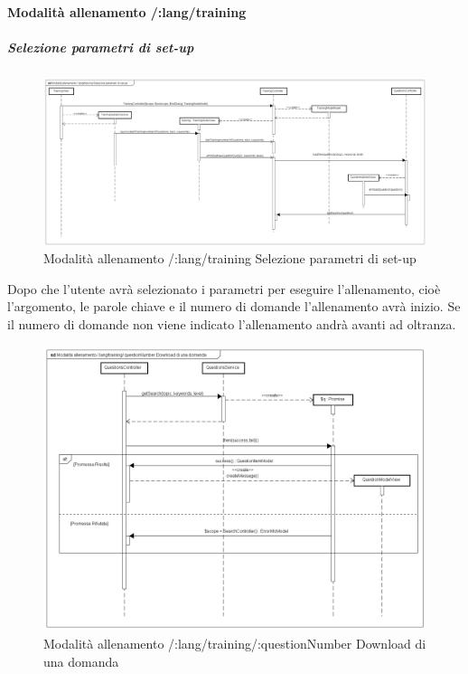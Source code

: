 \paragraph{Modalità allenamento /:lang/training}

\subparagraph{Selezione parametri di set-up}

\label{Modalità allenamento /:lang/training Selezione parametri di set-up}

\begin{figure}[ht]
	\centering
	\includegraphics[scale=0.25,keepaspectratio]{UML/DiagrammiDiSequenza/Front-End/Training_setUp.png}
	\caption{Modalità allenamento /:lang/training Selezione parametri di set-up}
\end{figure} \FloatBarrier

Dopo che l'utente avrà selezionato i parametri per eseguire l'allenamento, cioè l'argomento, le parole chiave e il numero di domande l'allenamento avrà inizio. Se il numero di domande non viene indicato l'allenamento andrà avanti ad oltranza.


\label{Modalità allenamento /:lang/training/:questionNumber Download di una domanda}

\begin{figure}[ht]
	\centering
	\includegraphics[scale=0.25,keepaspectratio]{UML/DiagrammiDiSequenza/Front-End/Training_downloadAquestion.png}
	\caption{Modalità allenamento /:lang/training/:questionNumber Download di una domanda}
\end{figure} \FloatBarrier

